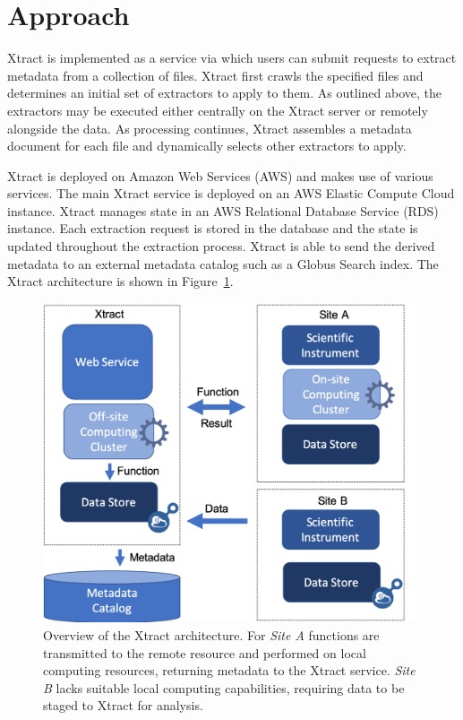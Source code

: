 \documentclass[sigconf]{acmart}
\newcommand{\name}{Xtract}
\begin{document}
\section{Approach}
\label{sec:approach}

\name{} is implemented as a service via which users can submit
requests to extract metadata from a collection of files.
\name{} first crawls the specified files and determines
an initial set of extractors to apply to them. 
As outlined above, the extractors may be executed
either centrally on the \name{} server or remotely alongside
the data. As processing continues, \name{} assembles 
a metadata document for each file and dynamically selects
other extractors to apply.


\name{} is deployed on Amazon Web Services (AWS) and makes use
of various services. The main \name{} service
is deployed on an AWS Elastic Compute Cloud instance.
\name{} manages state in an AWS Relational Database Service (RDS)
instance. Each extraction request is stored in the database
and the state is updated throughout the extraction process. 
\name{} is able to send the derived metadata to an external
metadata catalog such as a Globus Search index.
The \name{} architecture is shown in Figure~\ref{fig:arch}.

\begin{figure}[t]
	\centering
	\includegraphics[scale=0.3]{figs/new-arch.png}
	\caption{Overview of the \name{} architecture. For \textit{Site A} functions are transmitted to the remote resource and performed on local computing resources, returning metadata to the \name{} service. \textit{Site B} lacks suitable local
	computing capabilities, requiring data to be staged to \name{} for analysis.}
	\label{fig:arch}
\end{figure}
\end{document}
